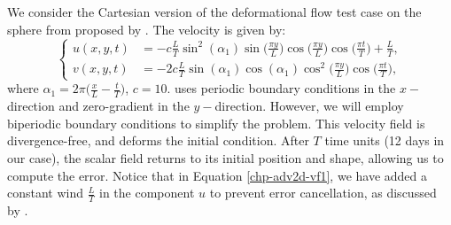 We consider the Cartesian version of the deformational flow test case on the sphere from \citet{nair:2010}
proposed by \citet{chen:2017}. The velocity is given by:
\begin{equation}
	\label{chp-adv2d-vf1}
	\begin{cases}
		u(x,y,t) &= -c\frac{L}{T} \sin^2(\alpha_1)\sin\big(\frac{\pi y}{L}\big)\cos\big(\frac{\pi y}{L}\big)  \cos\big(\frac{\pi t}{T}\big) + \frac{L}{T},\\
		v(x,y,t) &= -2c\frac{L}{T}\sin(\alpha_1)  \cos(\alpha_1)\cos^2\big(\frac{\pi y}{L}\big)\cos\big(\frac{\pi t}{T}\big),
	\end{cases}
\end{equation}
where $\alpha_1 = 2\pi\big(\frac{x}{L}-\frac{t}{T}\big)$, $c = 10$.
\citet{chen:2017} uses periodic boundary conditions in the $x-$direction and zero-gradient in the $y-$direction.
However, we will employ biperiodic boundary conditions to simplify the problem.
This velocity field is divergence-free, and deforms the initial condition.
After $T$ time units (12 days in our case), the scalar field returns to its initial position and shape, allowing us to compute the error.
Notice that in Equation \eqref{chp-adv2d-vf1}, we have added a constant wind $\frac{L}{T}$ in the component
$u$ to prevent error cancellation, as discussed by \citet{nair:2010}.
